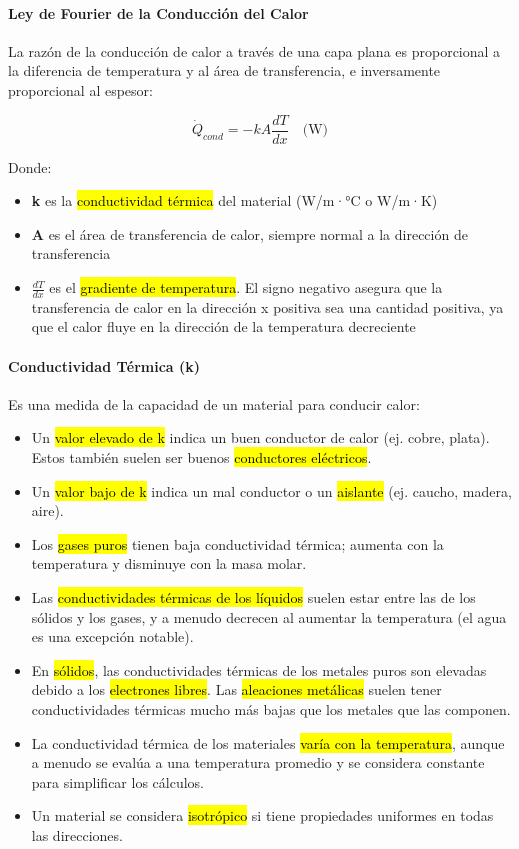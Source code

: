 \documentclass{article}
\begin{document}
    \paragraph{Ley de Fourier de la Conducción del Calor}

    La razón de la conducción de calor a través de una capa plana es proporcional a la diferencia de temperatura y al área de transferencia, e inversamente proporcional al espesor:

    \begin{equation}
    \dot{Q}_{cond} = -kA \frac{dT}{dx} \quad \text{(W)}
    \end{equation}

    Donde:
    \begin{itemize}
        \item \textbf{k} es la \hl{conductividad térmica} del material (W/m·°C o W/m·K)
        \item \textbf{A} es el área de transferencia de calor, siempre normal a la dirección de transferencia
        \item $\frac{dT}{dx}$ es el \hl{gradiente de temperatura}. El signo negativo asegura que la transferencia de calor en la dirección x positiva sea una cantidad positiva, ya que el calor fluye en la dirección de la temperatura decreciente
    \end{itemize}

    \paragraph{Conductividad Térmica (k)}

    Es una medida de la capacidad de un material para conducir calor:

    \begin{itemize}
        \item Un \hl{valor elevado de k} indica un buen conductor de calor (ej. cobre, plata). Estos también suelen ser buenos \hl{conductores eléctricos}.
        \item Un \hl{valor bajo de k} indica un mal conductor o un \hl{aislante} (ej. caucho, madera, aire).
        \item Los \hl{gases puros} tienen baja conductividad térmica; aumenta con la temperatura y disminuye con la masa molar.
        \item Las \hl{conductividades térmicas de los líquidos} suelen estar entre las de los sólidos y los gases, y a menudo decrecen al aumentar la temperatura (el agua es una excepción notable).
        \item En \hl{sólidos}, las conductividades térmicas de los metales puros son elevadas debido a los \hl{electrones libres}. Las \hl{aleaciones metálicas} suelen tener conductividades térmicas mucho más bajas que los metales que las componen.
        \item La conductividad térmica de los materiales \hl{varía con la temperatura}, aunque a menudo se evalúa a una temperatura promedio y se considera constante para simplificar los cálculos.
        \item Un material se considera \hl{isotrópico} si tiene propiedades uniformes en todas las direcciones.
    \end{itemize}
\end{document}
